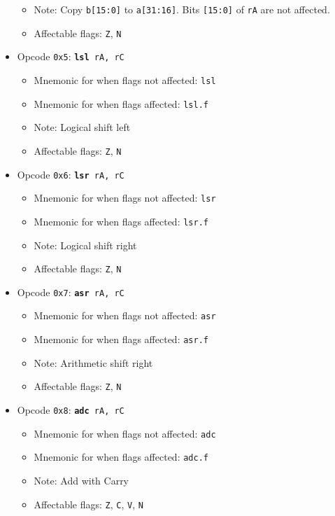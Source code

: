 \documentclass{article}
\begin{document}
\begin{itemize}
\begin{itemize}
			\item Note:  Copy \texttt{b[15:0]} to \texttt{a[31:16]}.
			Bits \texttt{[15:0]} of \texttt{rA} are not affected.
			\item Affectable flags:
				\texttt{Z}, \texttt{N}
		\end{itemize}
		\item Opcode \texttt{0x5}:
			\texttt{\textbf{lsl} rA, rC}
		\begin{itemize}
			\item Mnemonic for when flags not affected:  \texttt{lsl}
			\item Mnemonic for when flags affected:  \texttt{lsl.f}
			\item Note:  Logical shift left
			\item Affectable flags:
				\texttt{Z}, \texttt{N}
		\end{itemize}
		\item Opcode \texttt{0x6}:
			\texttt{\textbf{lsr} rA, rC}
		\begin{itemize}
			\item Mnemonic for when flags not affected:  \texttt{lsr}
			\item Mnemonic for when flags affected:  \texttt{lsr.f}
			\item Note:  Logical shift right
			\item Affectable flags:
				\texttt{Z}, \texttt{N}
		\end{itemize}
		\item Opcode \texttt{0x7}:
			\texttt{\textbf{asr} rA, rC}
		\begin{itemize}
			\item Mnemonic for when flags not affected:  \texttt{asr}
			\item Mnemonic for when flags affected:  \texttt{asr.f}
			\item Note:  Arithmetic shift right
			\item Affectable flags:
				\texttt{Z}, \texttt{N}
		\end{itemize}
		\item Opcode \texttt{0x8}:
			\texttt{\textbf{adc} rA, rC}
		\begin{itemize}
			\item Mnemonic for when flags not affected:  \texttt{adc}
			\item Mnemonic for when flags affected:  \texttt{adc.f}
			\item Note:  Add with Carry
			\item Affectable flags:
				\texttt{Z}, \texttt{C}, \texttt{V}, \texttt{N}

\end{itemize}
\end{itemize}
\end{document}
